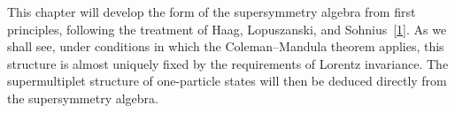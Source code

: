 
This chapter will develop the form of the supersymmetry algebra from first
principles, following the treatment of Haag, Lopuszanski, and
Sohnius~\hyperref[ch25-ref-1]{[1]}. As we shall see, under conditions in which
the Coleman--Mandula theorem applies, this structure is almost uniquely fixed
by the requirements of Lorentz invariance. The supermultiplet structure of
one-particle states will then be deduced directly from the supersymmetry
algebra.
